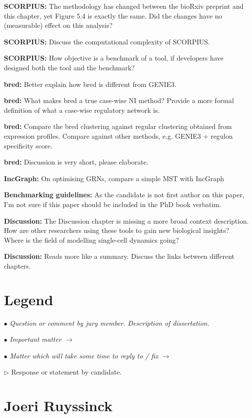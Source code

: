 \documentclass[10pt]{article}
\newcommand{\exam}[2][\  ]{\hspace{0pt}\marginpar{\color{red}#1}$\bullet$ \textit{#2}}
\newcommand{\imp}[1]{{\color{red} #1}}
\newcommand{\nimp}[1]{{\color{gray} #1}}
\newcommand{\answ}[1]{{\color{blue} $\triangleright$ #1}}
\newcommand{\bigexclaim}{\raisebox{-0.1em}{\BigTriangleUp}\hspace{-0.32em}\llap{\small\textbf{!}}\hspace{0.32em}}
\newcommand{\tagimp}{\bigexclaim}
\newcommand{\tagtime}{{\Large $\hourglass$}}
\begin{document}
{\textbf{SCORPIUS:} {The methodology has changed between the bioRxiv preprint and this chapter, yet Figure 5.4 is exactly the same. Did the changes have no (measurable) effect on this analysis?}

\textbf{SCORPIUS:} {Discuss the computational complexity of SCORPIUS.}

\textbf{SCORPIUS:} How objective is a benchmark of a tool, if developers have designed both the tool and the benchmark?

\textbf{bred:} {Better explain how bred is different from GENIE3.}

\textbf{bred:} {What makes bred a true case-wise NI method? Provide a more formal definition of what a case-wise regulatory network is.}

\textbf{bred:} {Compare the bred clustering against regular clustering obtained from expression profiles. Compare against other methods, e.g. GENIE3 + regulon specificity score.}

\textbf{bred:} {Discussion is very short, please elaborate.}

\textbf{IncGraph:} {On optimising GRNs, compare a simple MST with IncGraph}

\textbf{Benchmarking guidelines:} {As the candidate is not first author on this paper, I’m not sure if this paper
	should be included in the PhD book verbatim.}

\textbf{Discussion:} {The Discussion chapter is missing a more broad context
			description. How are other researchers using these tools to gain new biological insights? Where is the field of modelling single-cell dynamics going?}
		
\textbf{Discussion:} {Reads more like a summary. Discuss the links between different chapters.}

\newpage
\section{Legend}
\exam{Question or comment by jury member. \nimp{Description of dissertation.}}

\exam[\tagimp]{\imp{Important matter} $\rightarrow$}

\exam[\tagtime]{Matter which will take some time to reply to / fix $\rightarrow$}

\answ{Response or statement by candidate.}


\section{Joeri Ruyssinck}

}
\end{document}
